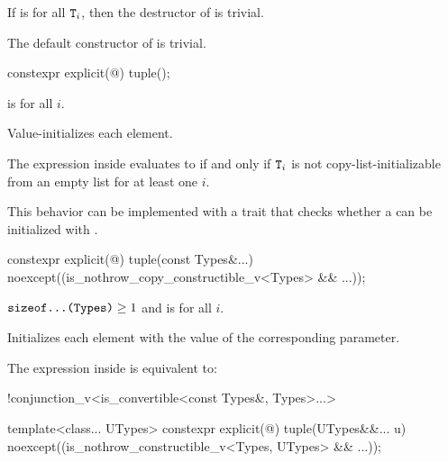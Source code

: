 \pnum
If  is  for all $\tcode{T}_i$,
then the destructor of  is trivial.

\pnum
The default constructor of  is trivial.

%
\begin{itemdecl}
constexpr explicit(@\seebelow@) tuple();
\end{itemdecl}

\begin{itemdescr}
\pnum
\constraints
{} is  for all $i$.

\pnum
\effects
Value-initializes each element.

\pnum
\remarks
The expression inside  evaluates to 
if and only if $\tcode{T}_i$ is not
copy-list-initializable from an empty list
for at least one $i$.
\begin{note}
This behavior can be implemented with a trait that checks whether
a  can be initialized with \tcode{\{\}}.
\end{note}
\end{itemdescr}

%
\begin{itemdecl}
constexpr explicit(@\seebelow@) tuple(const Types&...)
  noexcept((is_nothrow_copy_constructible_v<Types> && ...));
\end{itemdecl}

\begin{itemdescr}
\pnum
\constraints
$\tcode{sizeof...(Types)} \geq 1$ and
 is  for all $i$.

\pnum
\effects
Initializes each element with the value of the
corresponding parameter.

\pnum
\remarks
The expression inside  is equivalent to:
\begin{codeblock}
!conjunction_v<is_convertible<const Types&, Types>...>
\end{codeblock}
\end{itemdescr}

%
\begin{itemdecl}
template<class... UTypes> constexpr explicit(@\seebelow@) tuple(UTypes&&... u)
  noexcept((is_nothrow_constructible_v<Types, UTypes> && ...));
\end{itemdecl}

